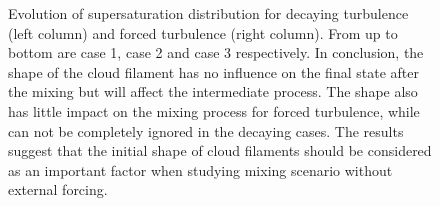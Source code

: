 \begin{figure}[H]\ContinuedFloat\centering
{}
\caption{Evolution of supersaturation distribution for decaying turbulence
(left column) and forced turbulence (right column). From up to bottom are case
1, case 2 and case 3 respectively. In conclusion, the shape of the cloud
filament has no influence on the final state after the mixing but will affect
the intermediate process. The shape also has little impact on the mixing
process for forced turbulence, while can not be completely ignored in the
decaying cases. The results suggest that the initial shape of cloud filaments
should be considered as an important factor when studying mixing scenario
without external forcing.}\label{fig:supersat_distri} \end{figure}

